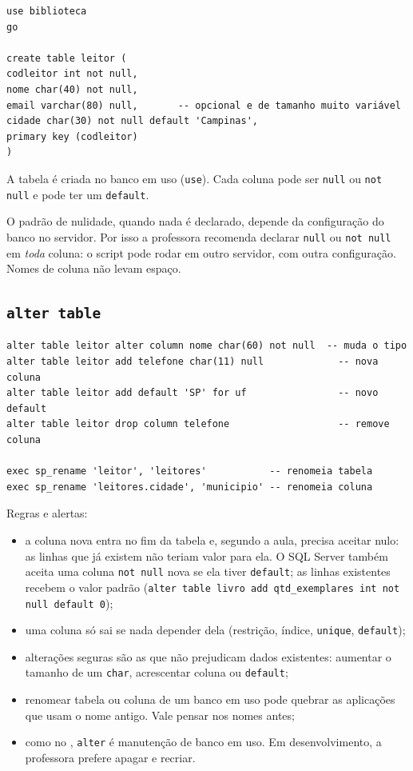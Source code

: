 \begin{lstlisting}[caption={Tabela com nulidade explícita e valor padrão.}]
use biblioteca
go

create table leitor (
codleitor int not null,
nome char(40) not null,
email varchar(80) null,       -- opcional e de tamanho muito variável
cidade char(30) not null default 'Campinas',
primary key (codleitor)
)
\end{lstlisting}

A tabela é criada no banco em uso (\texttt{use}). Cada coluna pode ser
\texttt{null} ou \texttt{not null} e pode ter um \texttt{default}.

O padrão de nulidade, quando nada é declarado, depende da configuração
do banco no servidor. Por isso a professora recomenda declarar
\texttt{null} ou \texttt{not null} em \emph{toda} coluna: o script pode
rodar em outro servidor, com outra configuração. Nomes de coluna não
levam espaço.

\subsection{\texttt{alter table}}

\begin{lstlisting}[caption={Alterações de estrutura.}]
alter table leitor alter column nome char(60) not null  -- muda o tipo
alter table leitor add telefone char(11) null             -- nova coluna
alter table leitor add default 'SP' for uf                -- novo default
alter table leitor drop column telefone                   -- remove coluna

exec sp_rename 'leitor', 'leitores'           -- renomeia tabela
exec sp_rename 'leitores.cidade', 'municipio' -- renomeia coluna
\end{lstlisting}

Regras e alertas:

\begin{itemize}
	\item a coluna nova entra no fim da tabela e, segundo a aula, precisa
	aceitar nulo: as linhas que já existem não teriam valor para ela. O SQL
	Server também aceita uma coluna \texttt{not null} nova se ela tiver
	\texttt{default}; as linhas existentes recebem o valor padrão
	(\texttt{alter table livro add qtd\_exemplares int not null default
	0});
	\item uma coluna só sai se nada depender dela (restrição, índice,
	\texttt{unique}, \texttt{default});
	\item alterações seguras são as que não prejudicam dados existentes:
	aumentar o tamanho de um \texttt{char}, acrescentar coluna ou
	\texttt{default};
	\item renomear tabela ou coluna de um banco em uso pode quebrar as
	aplicações que usam o nome antigo. Vale pensar nos nomes antes;
	\item como no , \texttt{alter} é manutenção de
	banco em uso. Em desenvolvimento, a professora prefere apagar e
	recriar.
\end{itemize}

